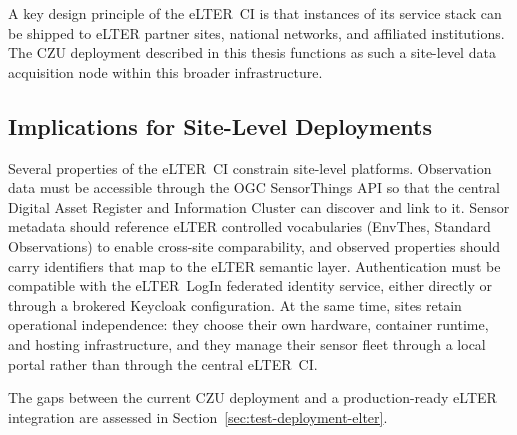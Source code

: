 A key design principle of the eLTER~CI is that instances of its service stack can be
shipped to eLTER partner sites, national networks, and affiliated institutions. The CZU
deployment described in this thesis functions as such a site-level data acquisition
node within this broader infrastructure.

\subsection{Implications for Site-Level Deployments}
\label{sec:bg-elter-implications}

Several properties of the eLTER~CI constrain site-level platforms. Observation
data must be accessible through the OGC SensorThings API so that the central
Digital Asset Register and Information Cluster can discover and link to it.
Sensor metadata should reference eLTER controlled vocabularies (EnvThes,
Standard Observations) to enable cross-site comparability, and observed
properties should carry identifiers that map to the eLTER semantic layer.
Authentication must be compatible with the eLTER~LogIn federated identity
service, either directly or through a brokered Keycloak configuration.
At the same time, sites retain operational independence: they choose their own
hardware, container runtime, and hosting infrastructure, and they manage their
sensor fleet through a local portal rather than through the central eLTER~CI.

The gaps between the current CZU deployment and a production-ready eLTER
integration are assessed in Section~\ref{sec:test-deployment-elter}.
